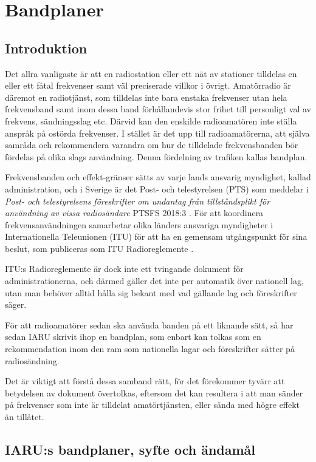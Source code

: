 \section{Bandplaner}
\label{bandplaner}

\subsection{Introduktion}

Det allra vanligaste är att en radiostation eller ett nät av stationer tilldelas
en eller ett fåtal frekvenser samt väl preciserade villkor i övrigt.
Amatörradio är däremot en radiotjänst, som tilldelas inte bara enstaka
frekvenser utan hela frekvensband samt inom dessa band förhållandevis stor
frihet till personligt val av frekvens, sändningsslag etc.
Därvid kan den enskilde radioamatören inte ställa anspråk på ostörda frekvenser.
I stället är det upp till radioamatörerna, att själva samråda och rekommendera
varandra om hur de tilldelade frekvensbanden bör fördelas på olika slags
användning.
Denna fördelning av trafiken kallas bandplan.

Frekvensbanden och effekt-gränser sätts av varje lands ansvarig myndighet,
kallad administration, och i Sverige är det Post- och telestyrelsen (PTS) som
meddelar i \emph{Post- och telestyrelsens föreskrifter om undantag från
tillståndsplikt för användning av vissa radiosändare} PTSFS 2018:3
\cite{PTSFS2018:3}.
För att koordinera frekvensanvändningen samarbetar olika länders ansvariga
myndigheter i Internationella Teleunionen (ITU) för att ha en gemensam
utgångspunkt för sina beslut, som publiceras som
ITU Radioreglemente \cite{ITU-RR}.

ITU:s Radioreglemente är dock inte ett tvingande dokument för
administrationerna, och därmed gäller det inte per automatik över
nationell lag, utan man behöver alltid hålla sig bekant med vad gällande lag
och föreskrifter säger.

För att radioamatörer sedan ska använda banden på ett liknande sätt, så har
sedan IARU skrivit ihop en bandplan, som enbart kan tolkas som en rekommendation
inom den ram som nationella lagar och föreskrifter sätter på radiosändning.

Det är viktigt att förstå dessa samband rätt, för det förekommer tyvärr att
betydelsen av dokument övertolkas, eftersom det kan resultera i att man sänder
på frekvenser som inte är tilldelat amatörtjänsten, eller sända med högre
effekt än tillåtet.

\subsection{IARU:s bandplaner, syfte och ändamål}

